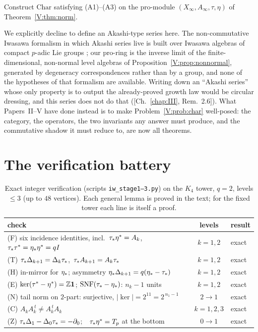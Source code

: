 \begin{problem}\label{V:prob:char}
Construct $\mathrm{Char}$ satisfying (A1)--(A3) on the pro-module
$(X_\infty,A_\infty,\tau,\eta)$ of Theorem~\ref{V:thm:norm}.
\end{problem}

We explicitly decline to define an Akashi-type series here. The non-commutative
Iwasawa formalism in which Akashi series live is built over Iwasawa algebras of
compact $p$-adic Lie groups \cite{CFKSV}; our pro-ring is the inverse limit of the
finite-dimensional, non-normal level algebras of
Proposition~\ref{V:prop:nonnormal}, generated by degeneracy correspondences rather
than by a group, and none of the hypotheses of that formalism are available. Writing
down an ``Akashi series'' whose only property is to output the already-proved growth
law would be circular dressing, and this series does not do that
([Ch.~\ref{chap:III}, Rem.~2.6]). What Papers~II--V have done instead is to make
Problem~\ref{V:prob:char} well-posed: the category, the operators, the two invariants
any answer must produce, and the commutative shadow it must reduce to, are now all
theorems.

\section{The verification battery}\label{V:sec:battery}

\begin{table}[ht]
\centering\small
\renewcommand{\arraystretch}{1.2}
\begin{tabular}{lcl}
\toprule
check & levels & result\\
\midrule
(F) six incidence identities, incl.\ $\tau_*\eta^*=A_k$, $\tau_*\tau^*=\eta_*\eta^*=qI$ & $k=1,2$ & exact\\
(T) $\tau_*\Delta_{k+1}=\Delta_k\tau_*$,\ $\tau_* A_{k+1}=A_k\tau_*$ & $k=1,2$ & exact\\
(H) in-mirror for $\eta_*$; asymmetry $\eta_*\Delta_{k+1}=q(\eta_*-\tau_*)$ & $k=1,2$ & exact\\
(E) $\ker(\tau^*-\eta^*)=\mathbb{Z}\mathbf1$; $\mathrm{SNF}(\tau_*-\eta_*)$: $n_k{-}1$ units & $k=1,2$ & exact\\
(N) tail norm on $2$-part: surjective, $|\ker|=2^{11}=2^{\,n_1-1}$ & $2\to1$ & exact\\
(C) $A_kA_k^{\,t}\neq A_k^{\,t}A_k$ & $k=1,2,3$ & exact\\
(Z) $\tau_*\Delta_1-\Delta_0\tau_*=-\partial_0$;\ \ $\tau_*\eta^*=T_p$ at the bottom & $0\to1$ & exact\\
\bottomrule
\end{tabular}
\medskip
\caption{Exact integer verification (scripts \texttt{iw\_stage1--3.py}) on the $K_4$
tower, $q=2$, levels $\le3$ (up to $48$ vertices). Each general lemma is proved in
the text; for the fixed tower each line is itself a proof.}
\label{V:tab:battery}
\end{table}

